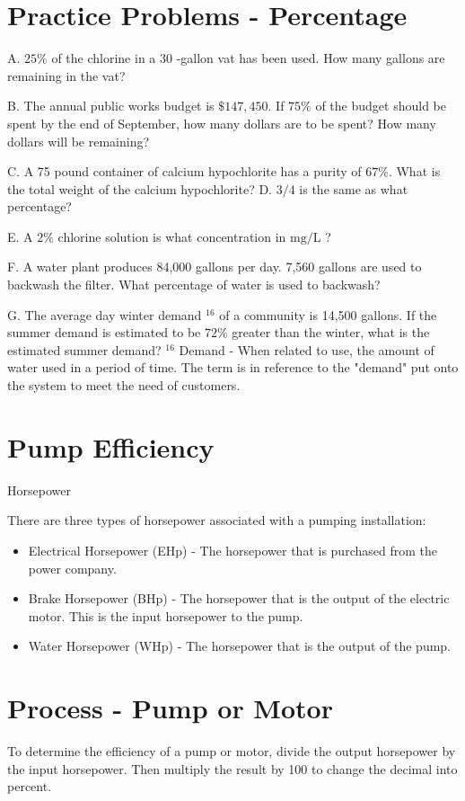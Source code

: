 \documentclass[10pt]{article}
\begin{document}
\section{Practice Problems - Percentage}
A. $25 \%$ of the chlorine in a 30 -gallon vat has been used. How many gallons are remaining in the vat?

B. The annual public works budget is $\$ 147,450$. If $75 \%$ of the budget should be spent by the end of September, how many dollars are to be spent? How many dollars will be remaining?

C. A 75 pound container of calcium hypochlorite has a purity of $67 \%$. What is the total weight of the calcium hypochlorite? D. $3 / 4$ is the same as what percentage?

E. A $2 \%$ chlorine solution is what concentration in $\mathrm{mg} / \mathrm{L}$ ?

F. A water plant produces 84,000 gallons per day. 7,560 gallons are used to backwash the filter. What percentage of water is used to backwash?

G. The average day winter demand ${ }^{16}$ of a community is 14,500 gallons. If the summer demand is estimated to be $72 \%$ greater than the winter, what is the estimated summer demand? ${ }^{16}$ Demand - When related to use, the amount of water used in a period of time. The term is in reference to the "demand" put onto the system to meet the need of customers.

\section{Pump Efficiency}
Horsepower

There are three types of horsepower associated with a pumping installation:

\begin{itemize}
  \item Electrical Horsepower (EHp) - The horsepower that is purchased from the power company.

  \item Brake Horsepower (BHp) - The horsepower that is the output of the electric motor. This is the input horsepower to the pump.

  \item Water Horsepower (WHp) - The horsepower that is the output of the pump.

\end{itemize}
\section{Process - Pump or Motor}
To determine the efficiency of a pump or motor, divide the output horsepower by the input horsepower. Then multiply the result by 100 to change the decimal into percent.
\end{document}
